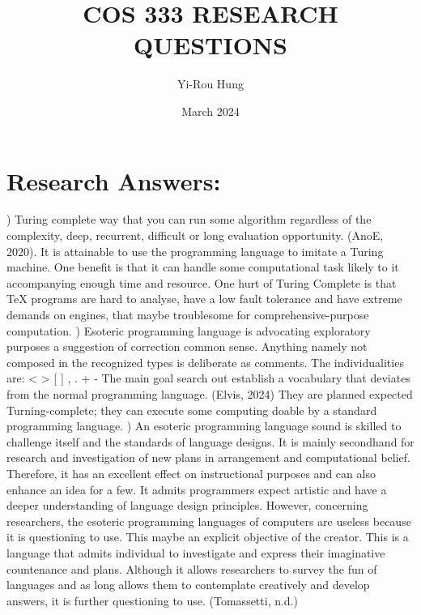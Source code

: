 \documentclass{article}
\title{COS 333 RESEARCH QUESTIONS}
\author{Yi-Rou Hung}
\date{March 2024}
\begin{document}
\maketitle

\section*{Research Answers:}

) Turing complete way that you can run some algorithm regardless of the complexity, deep, recurrent, difficult or long evaluation opportunity. (AnoE, 2020). It is attainable to use the programming language to imitate a Turing machine. One benefit is that it can handle some computational task likely to it accompanying enough time and resource. One hurt of Turing Complete is that TeX programs are hard to analyse, have a low fault tolerance and have extreme demands on engines, that maybe troublesome for comprehensive-purpose computation.
\newline\newline
{}) Esoteric programming language is advocating exploratory purposes a suggestion of correction common sense. Anything namely not composed in the recognized types is deliberate as comments. The individualities are: < > [ ] , . + - The main goal search out establish a vocabulary that deviates from the normal programming language. (Elvis, 2024) They are planned expected Turning-complete; they can execute some computing doable by a standard programming language.
\newline\newline
{}) An esoteric programming language sound is skilled to challenge itself and the standards of language designs. It is mainly secondhand for research and investigation of new plans in arrangement and computational belief. Therefore, it has an excellent effect on instructional purposes and can also enhance an idea for a few. It admits programmers expect artistic and have a deeper understanding of language design principles. However, concerning researchers, the esoteric programming languages of computers are useless because it is questioning to use. This maybe an explicit objective of the creator. This is a language that admits individual to investigate and express their imaginative countenance and plans. Although it allows researchers to survey the fun of languages and as long allows them to contemplate creatively and develop answers, it is further questioning to use. (Tomassetti, n.d.)
\newline\newline
\end{document}
